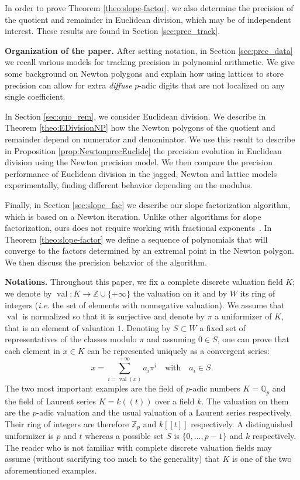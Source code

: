 \documentclass{sig-alternate-2013}
\DeclareMathOperator{\val}{val}
\newcommand{\Z}{\mathbb Z}
\newcommand{\Zp}{\Z_p}
\newcommand{\Q}{\mathbb Q}
\newcommand{\Qp}{\Q_p}
\def\todo#1{\ \!\!{\color{red} #1}}
\begin{document}
In order to prove Theorem \ref{theo:slope-factor}, we also determine
the precision of the quotient and remainder in Euclidean division,
which may be of independent interest.  These results are found in
Section \ref{sec:prec_track}.

\medskip

\noindent
{\bf Organization of the paper.}
%
After setting notation, in
Section \ref{sec:prec_data} we recall various models for tracking
precision in polynomial arithmetic.  We give some background
on Newton polygons and explain how using lattices to store
precision can allow for extra \emph{diffuse} $p$-adic digits that
are not localized on any single coefficient.

In Section \ref{sec:quo_rem}, we consider Euclidean division.
We describe in Theorem \ref{theo:EDivisionNP}
how the Newton polygons of the quotient and remainder
depend on numerator and denominator.  We use this
result to describe in Proposition \ref{prop:NewtonprecEuclide}
the precision evolution in Euclidean division using
the Newton precision model.  We then compare the
precision performance of Euclidean division in the
jagged, Newton and lattice models experimentally,
finding different behavior depending on the modulus.

Finally, in Section \ref{sec:slope_fac} we describe
our slope factorization algorithm, which is based on
a Newton iteration.  Unlike other algorithms for
slope factorization, ours does not require working
with fractional exponents\todo{ citation?}.  In Theorem
\ref{theo:slope-factor} we define a sequence
of polynomials that will converge to the factors
determined by an extremal point in the Newton
polygon.  We then discuss the precision behavior
of the algorithm.

\medskip

\noindent
{\bf Notations.}
Throughout this paper, we fix a complete discrete valuation field $K$; 
we denote by $\val : K \to \Z \cup \{+\infty\}$ the valuation on it and 
by $W$ its ring of integers (\emph{i.e.} the set of elements with 
nonnegative valuation). We assume that $\val$ is normalized so that it
is surjective and denote by $\pi$ a uniformizer of $K$, that is an 
element of valuation $1$. Denoting by $S \subset W$ a fixed set of 
representatives of the classes modulo $\pi$ and assuming $0 \in S$, 
one can prove that each element in $x \in K$ can be represented 
uniquely as a convergent series:
\begin{equation}
\label{eq:CDVFseries}
x = \sum_{i=\val(x)}^{+\infty} a_i \pi^i
\quad \text{with} \quad a_i \in S.
\end{equation}
The two most important examples are the field of $p$-adic numbers $K = 
\Qp$ and the field of Laurent series $K = k((t))$ over a field $k$. The 
valuation on them are the $p$-adic valuation and the usual valuation of 
a Laurent series respectively. Their ring of integers are therefore 
$\Zp$ and $k[[t]]$ respectively. A distinguished uniformizer is $p$ 
and $t$ whereas a possible set $S$ is $\{0, \ldots, p-1\}$ and $k$
respectively.
The reader who is not familiar with complete discrete valuation fields
may assume (without sacrifying too much to the generality) that $K$ is
one of the two aforementioned examples.
\end{document}
